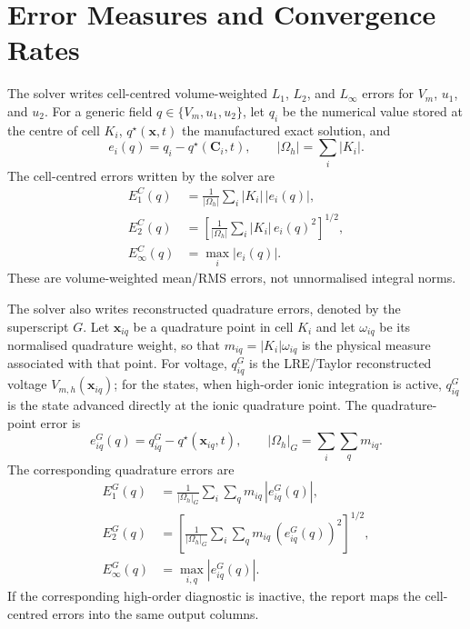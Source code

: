 \documentclass[11pt,a4paper]{article}
\begin{document}
\section{Error Measures and Convergence Rates}
The solver writes cell-centred volume-weighted $L_1$, $L_2$, and $L_\infty$
errors for $V_m$, $u_1$, and $u_2$. For a generic field $q\in\{V_m,u_1,u_2\}$,
let $q_i$ be the numerical value stored at the centre of cell $K_i$,
$q^\star(\mathbf{x},t)$ the manufactured exact solution, and
\begin{equation}
  e_i(q)=q_i-q^\star(\mathbf{C}_i,t),
  \qquad
  |\Omega_h|=\sum_i |K_i|.
\end{equation}
The cell-centred errors written by the solver are
\begin{align}
  E_{1}^{C}(q)
  &=
  \frac{1}{|\Omega_h|}
  \sum_i |K_i|\,|e_i(q)|,
  \label{eq:cell-l1-error}
  \\
  E_{2}^{C}(q)
  &=
  \left[
  \frac{1}{|\Omega_h|}
  \sum_i |K_i|\,e_i(q)^2
  \right]^{1/2},
  \label{eq:cell-l2-error}
  \\
  E_{\infty}^{C}(q)
  &=
  \max_i |e_i(q)|.
  \label{eq:cell-linf-error}
\end{align}
These are volume-weighted mean/RMS errors, not unnormalised integral norms.

The solver also writes reconstructed quadrature errors, denoted by the
superscript $G$. Let $\mathbf{x}_{iq}$ be a quadrature point in cell $K_i$ and
let $\omega_{iq}$ be its normalised quadrature weight, so that
$m_{iq}=|K_i|\omega_{iq}$ is the physical measure associated with that point.
For voltage, $q^G_{iq}$ is the LRE/Taylor reconstructed voltage
$V_{m,h}(\mathbf{x}_{iq})$; for the states, when high-order ionic integration is
active, $q^G_{iq}$ is the state advanced directly at the ionic quadrature point.
The quadrature-point error is
\begin{equation}
  e_{iq}^{G}(q)=q^G_{iq}-q^\star(\mathbf{x}_{iq},t),
  \qquad
  |\Omega_h|_G=\sum_i\sum_q m_{iq}.
\end{equation}
The corresponding quadrature errors are
\begin{align}
  E_{1}^{G}(q)
  &=
  \frac{1}{|\Omega_h|_G}
  \sum_i\sum_q m_{iq}\,|e_{iq}^{G}(q)|,
  \label{eq:gauss-l1-error}
  \\
  E_{2}^{G}(q)
  &=
  \left[
  \frac{1}{|\Omega_h|_G}
  \sum_i\sum_q m_{iq}\,\left(e_{iq}^{G}(q)\right)^2
  \right]^{1/2},
  \label{eq:gauss-l2-error}
  \\
  E_{\infty}^{G}(q)
  &=
  \max_{i,q} |e_{iq}^{G}(q)|.
  \label{eq:gauss-linf-error}
\end{align}
If the corresponding high-order diagnostic is inactive, the report maps the
cell-centred errors into the same output columns.
\end{document}
